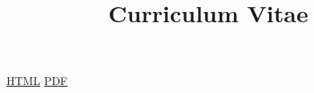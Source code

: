 \documentclass{article}
\begin{document}
\title{Curriculum Vitae}
\maketitle
\href{web/cv.html}{HTML}
\href{print/cv.pdf}{PDF}
\end{document}
